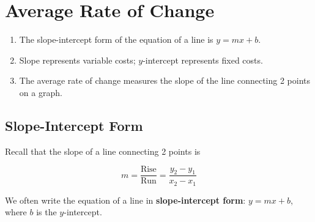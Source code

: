 \documentclass{article}
\begin{document}
\section*{Average Rate of Change}

\begin{tcolorbox}[colframe=orange!70!white, coltitle=black, title=\textbf{Summary}]
\begin{enumerate}
    \item The slope-intercept form of the equation of a line is $y = mx + b$.
    \item Slope represents variable costs; $y$-intercept represents fixed costs.
    \item The average rate of change measures the slope of the line connecting 2 points on a graph.
\end{enumerate}
\end{tcolorbox}
\vspace{0.5in}

\subsection*{Slope-Intercept Form}

Recall that the slope of a line connecting 2 points is  \newline\\
\begin{minipage}{0.2\textwidth}
\[
m = \frac{\text{Rise}}{\text{Run}} = \frac{y_2-y_1}{x_2-x_1}
\]
\end{minipage}
\hfill 
\begin{minipage}{0.4\textwidth}
\end{minipage}  \hfill 
\vspace{0.5in}

We often write the equation of a line in \textbf{slope-intercept form}: $y = mx+b$, where $b$ is the $y$-intercept.  
\end{document}
